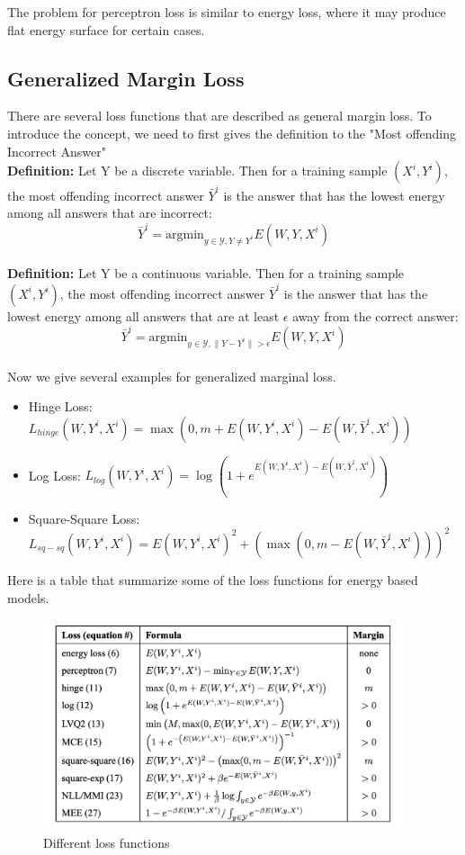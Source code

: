 The problem for perceptron loss is similar to energy loss,
where it may produce flat energy surface for certain cases.

\subsection{Generalized Margin Loss}

There are several loss functions that are described as general margin loss.
To introduce the concept, we need to first gives the definition 
to the "Most offending Incorrect Answer"\\

\textbf{Definition: } Let Y be a discrete variable. Then for a training sample $(X^i, Y^i)$,
the most offending incorrect answer $\bar{Y}^i$
is the answer that has the lowest energy among all answers that are incorrect:
\[
    \bar{Y}^i = \text{argmin}_{y \in \mathcal{Y}, Y \neq Y^i}
    E(W, Y, X^i)
\]
\\
\textbf{Definition: } Let Y be a continuous variable. 
Then for a training sample $(X^i, Y^i)$,
the most offending incorrect answer $\bar{Y}^i$
is the answer that has the lowest energy among all answers
that are at least $\epsilon$ away from the correct answer:
\[
    \bar{Y}^i = \text{argmin}_{y \in \mathcal{Y}, \parallel	Y-Y^i\parallel > \epsilon}
    E(W, Y, X^i)
\]
\\
Now we give several examples for generalized marginal loss.
\begin{itemize}
    \item Hinge Loss: 
    $L_{hinge}(W, Y^i, X^i) = \max(0, m + E(W, Y^i, X^i) - E(W, \bar{Y}^i, X^i))$
    \item Log Loss:
    $L_{log}(W, Y^i, X^i) = \log(1 + e^{E(W, Y^i, X^i) - E(W, \bar{Y}^i, X^i)})$
    \item Square-Square Loss:
    $L_{sq-sq}(W, Y^i, X^i) = E(W, Y^i, X^i)^2 + (\max(0, m - E(W, \bar{Y}^i, X^i)))^2$

\end{itemize}

Here is a table that summarize some of the loss functions for energy based models.
\begin{figure}[!ht]
    \centering
    \includegraphics[width=300pt]{figs/loss_zoo.png}
    \caption{Different loss functions}
    \label{fig:energy_based_models_loss_functions}
\end{figure}


